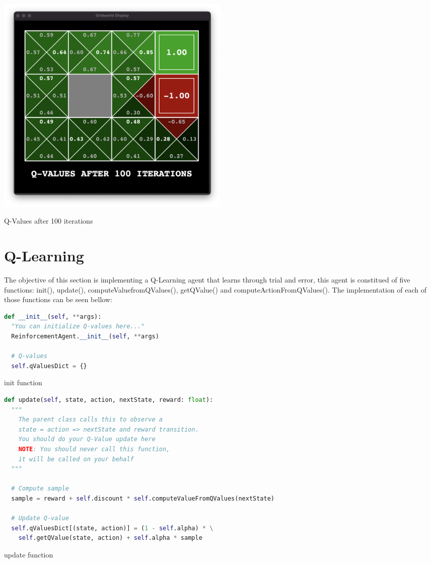 \documentclass{article}
\begin{document}
\begin{table}[ht!]
  \begin{center}
    \includegraphics[width=0.5\textwidth]{images/qValues-ex3.png}
  \end{center}
\caption{Q-Values after 100 iterations}
\end{table}

\pagebreak
\section{Q-Learning}

The objective of this section is implementing a Q-Learning agent that learns through trial and error, this agent is constitued of five functions: init(), update(), computeValuefromQValues(), getQValue() and computeActionFromQValues().
The implementation of each of those functions can be seen bellow:

\begin{table} [ht!]
  \begin{lstlisting}[language=python, frame=tlbr, framesep=6pt, backgroundcolor=\color{light-gray}]
  def __init__(self, **args):
  "You can initialize Q-values here..."
  ReinforcementAgent.__init__(self, **args)

  # Q-values
  self.qValuesDict = {}
  \end{lstlisting}
  \caption{init function}
\end{table}

\begin{table} [ht!]
  \begin{lstlisting}[language=python, frame=tlbr, framesep=6pt, backgroundcolor=\color{light-gray}]
  def update(self, state, action, nextState, reward: float):
  """
    The parent class calls this to observe a
    state = action => nextState and reward transition.
    You should do your Q-Value update here
    NOTE: You should never call this function,
    it will be called on your behalf
  """
  
  # Compute sample
  sample = reward + self.discount * self.computeValueFromQValues(nextState)

  # Update Q-value
  self.qValuesDict[(state, action)] = (1 - self.alpha) * \
    self.getQValue(state, action) + self.alpha * sample

  \end{lstlisting}
  \caption{update function}
\end{table}
\end{document}
